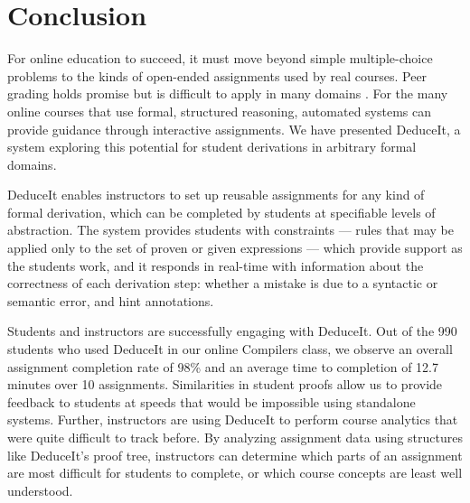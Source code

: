 \documentclass{sigchi}
\begin{document}








\section{Conclusion}

For online education to succeed, it must move beyond simple multiple-choice problems to the kinds of open-ended assignments used by real courses. Peer grading holds promise but is difficult to apply in many domains \cite{peer-consistency}. For the many online courses that use formal, structured reasoning, automated systems can provide guidance through interactive assignments. We have presented DeduceIt, a system exploring this potential for student derivations in arbitrary formal domains. 

DeduceIt enables instructors to set up reusable assignments for any kind of formal derivation, which can be completed by students at specifiable levels of abstraction. The system provides students with constraints --- rules that may be applied only to the set of proven or given expressions --- which provide support as the students work, and it responds in real-time with information about the correctness of each derivation step: whether a mistake is due to a syntactic or semantic error, and hint annotations.

Students and instructors are successfully engaging with DeduceIt. Out of the 990 students who used DeduceIt in our online Compilers class, we observe an overall assignment completion rate of 98\% and an average time to completion of 12.7 minutes over 10 assignments. Similarities in student proofs allow us to provide feedback to students at speeds that would be impossible using standalone systems. Further, instructors are using DeduceIt to perform course analytics that were quite difficult to track before. By analyzing assignment data using structures like DeduceIt's proof tree, instructors can determine which parts of an assignment are most difficult for students to complete, or which course concepts are least well understood.
\end{document}

